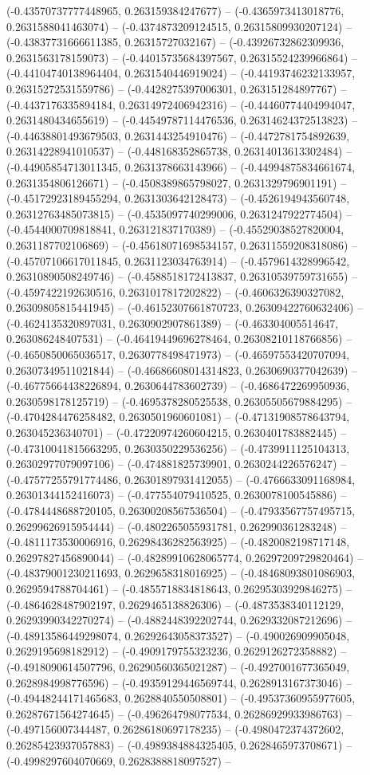 (-0.43570737777448965, 0.263159384247677) -- (-0.4365973413018776, 0.2631588041463074) -- (-0.4374873209124515, 0.26315809930207124) -- (-0.43837731666611385, 0.26315727032167) -- (-0.43926732862309936, 0.2631563178159073) -- (-0.44015735684397567, 0.26315524239966864) -- (-0.44104740138964404, 0.2631540446919024) -- (-0.44193746232133957, 0.26315272531559786) -- (-0.4428275397006301, 0.263151284897767) -- (-0.4437176335894184, 0.26314972406942316) -- (-0.44460774404994047, 0.2631480434655619) -- (-0.44549787114476536, 0.26314624372513823) -- (-0.44638801493679503, 0.2631443254910476) -- (-0.4472781754892639, 0.26314228941010537) -- (-0.448168352865738, 0.26314013613302484) -- (-0.44905854713011345, 0.2631378663143966) -- (-0.44994875834661674, 0.2631354806126671) -- (-0.4508389865798027, 0.2631329796901191) -- (-0.45172923189455294, 0.2631303642128473) -- (-0.4526194943560748, 0.26312763485073815) -- (-0.4535097740299006, 0.2631247922774504) -- (-0.4544000709818841, 0.263121837170389) -- (-0.45529038527820004, 0.2631187702106869) -- (-0.45618071698534157, 0.26311559208318086) -- (-0.45707106617011845, 0.2631123034763914) -- (-0.4579614328996542, 0.26310890508249746) -- (-0.4588518172413837, 0.26310539759731655) -- (-0.4597422192630516, 0.2631017817202822) -- (-0.4606326390327082, 0.26309805815441945) -- (-0.46152307661870723, 0.26309422760632406) -- (-0.4624135320897031, 0.2630902907861389) -- (-0.463304005514647, 0.263086248407531) -- (-0.46419449696278464, 0.26308210118766856) -- (-0.4650850065036517, 0.2630778498471973) -- (-0.46597553420707094, 0.26307349511021844) -- (-0.46686608014314823, 0.2630690377042639) -- (-0.46775664438226894, 0.2630644783602739) -- (-0.4686472269950936, 0.2630598178125719) -- (-0.4695378280525538, 0.26305505679884295) -- (-0.4704284476258482, 0.2630501960601081) -- (-0.47131908578643794, 0.263045236340701) -- (-0.47220974260604215, 0.2630401783882445) -- (-0.47310041815663295, 0.2630350229536256) -- (-0.4739911125104313, 0.26302977079097106) -- (-0.474881825739901, 0.2630244226576247) -- (-0.47577255791774486, 0.26301897931412055) -- (-0.4766633091168984, 0.26301344152416073) -- (-0.477554079410525, 0.2630078100545886) -- (-0.4784448688720105, 0.26300208567536504) -- (-0.47933567757495715, 0.26299626915954444) -- (-0.4802265055931781, 0.262990361283248) -- (-0.4811173530006916, 0.26298436282563925) -- (-0.4820082198717148, 0.26297827456890044) -- (-0.48289910628065774, 0.26297209729820464) -- (-0.48379001230211693, 0.2629658318016925) -- (-0.48468093801086903, 0.2629594788704461) -- (-0.4855718834818643, 0.26295303929846275) -- (-0.4864628487902197, 0.2629465138826306) -- (-0.4873538340112129, 0.26293990342270274) -- (-0.4882448392202744, 0.2629332087212696) -- (-0.48913586449298074, 0.26292643058373527) -- (-0.490026909905048, 0.2629195698182912) -- (-0.4909179755323236, 0.2629126272358882) -- (-0.4918090614507796, 0.26290560365021287) -- (-0.4927001677365049, 0.2628984998776596) -- (-0.49359129446569744, 0.2628913167373046) -- (-0.49448244171465683, 0.2628840550508801) -- (-0.49537360955977605, 0.26287671564274645) -- (-0.496264798077534, 0.26286929933986763) -- (-0.497156007344487, 0.26286180697178235) -- (-0.4980472374372602, 0.26285423937057883) -- (-0.4989384884325405, 0.2628465973708671) -- (-0.4998297604070669, 0.2628388818097527) -- 
